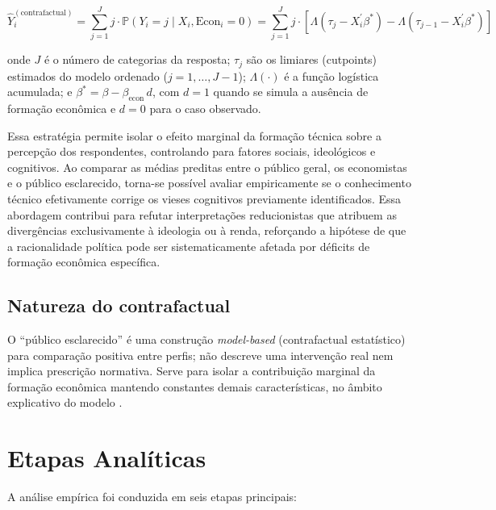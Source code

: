 \[
\hat{Y}_i^{(\text{contrafactual})} = \sum_{j=1}^J j \cdot \mathbb{P}(Y_i = j \mid X_i, \text{Econ}_i = 0) = \sum_{j=1}^J j \cdot \left[ \Lambda(\tau_j - X_i^\prime \beta^*) - \Lambda(\tau_{j-1} - X_i^\prime \beta^*) \right]
\]

\noindent onde $J$ é o número de categorias da resposta; $\tau_j$ são os limiares (cutpoints) estimados do modelo ordenado ($j=1,\ldots,J-1$); $\Lambda(\cdot)$ é a função logística acumulada; e $\beta^* = \beta - \beta_{\text{econ}}\, d$, com $d=1$ quando se simula a ausência de formação econômica e $d=0$ para o caso observado.


\bigskip

Essa estratégia permite isolar o efeito marginal da formação técnica sobre a percepção dos respondentes, controlando para fatores sociais, ideológicos e cognitivos. Ao comparar as médias preditas entre o público geral, os economistas e o público esclarecido, torna-se possível avaliar empiricamente se o conhecimento técnico efetivamente corrige os vieses cognitivos previamente identificados. Essa abordagem contribui para refutar interpretações reducionistas que atribuem as divergências exclusivamente à ideologia ou à renda, reforçando a hipótese de que a racionalidade política pode ser sistematicamente afetada por déficits de formação econômica específica.

\subsection{Natureza do contrafactual}
O “público esclarecido” é uma construção \textit{model-based} (contrafactual estatístico) para comparação positiva entre perfis; não descreve uma intervenção real nem implica prescrição normativa. Serve para isolar a contribuição marginal da formação econômica mantendo constantes demais características, no âmbito explicativo do modelo \cite{hausman2008}.



\section{Etapas Analíticas}

A análise empírica foi conduzida em seis etapas principais:

